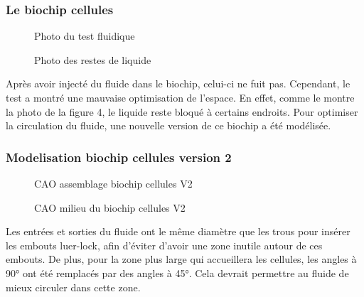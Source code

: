 \documentclass[a4paper, 11pt]{article}
\begin{document}
\subsubsection{Le biochip cellules}
\begin{multicols}{2}
    \begin{figure}[H]
        \centering
        \caption{Photo du test fluidique}
        \label{fig: fluide_cellules}
    \end{figure}
    \begin{figure}[H]
        \centering
        \caption{Photo des restes de liquide}
        \label{fig:reste_cellules}
    \end{figure}
\end{multicols}
Après avoir injecté du fluide dans le biochip, celui-ci ne fuit pas. Cependant, le test a montré une mauvaise optimisation de l'espace. En effet, comme le montre la photo de la figure 4, le liquide reste bloqué à certains endroits. Pour optimiser la circulation du fluide, une nouvelle version de ce biochip a été modélisée.
\newpage
\subsubsection{Modelisation biochip cellules version 2}
\begin{multicols}{2}
    \begin{figure}[H]
        \centering
        \caption{CAO assemblage biochip cellules V2}
        \label{fig: CAO_cellulesV2}
    \end{figure}
    \begin{figure}[H]
        \centering
        \caption{CAO milieu du biochip cellules V2}
        \label{fig:milieu_cellulesV2}
    \end{figure}
\end{multicols}
Les entrées et sorties du fluide ont le même diamètre que les trous pour insérer les embouts luer-lock, afin d'éviter d'avoir une zone inutile autour de ces embouts.
De plus, pour la zone plus large qui accueillera les cellules, les angles à 90° ont été remplacés par des angles à 45°. Cela devrait permettre au fluide de mieux circuler dans cette zone.
\end{document}
